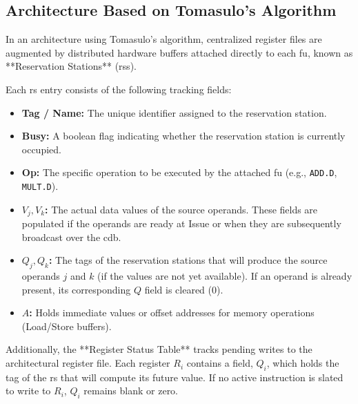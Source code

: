 \subsection{ Architecture Based on Tomasulo's Algorithm}
\label{subsec:tomasulo_fp_arch}

In an architecture using Tomasulo's algorithm, centralized register files are augmented by distributed hardware buffers attached directly to each \gls{fu}, known as **Reservation Stations** (\glspl{rs}). 

Each \gls{rs} entry consists of the following tracking fields:
\begin{itemize}
    \item \textbf{Tag / Name:} The unique identifier assigned to the reservation station.
    \item \textbf{Busy:} A boolean flag indicating whether the reservation station is currently occupied.
    \item \textbf{Op:} The specific operation to be executed by the attached \gls{fu} (e.g., \texttt{ADD.D}, \texttt{MULT.D}).
    \item \textbf{$V_j, V_k$:} The actual data values of the source operands. These fields are populated if the operands are ready at Issue or when they are subsequently broadcast over the \gls{cdb}.
    \item \textbf{$Q_j, Q_k$:} The tags of the reservation stations that will produce the source operands $j$ and $k$ (if the values are not yet available). If an operand is already present, its corresponding $Q$ field is cleared ($0$).
    \item \textbf{$A$:} Holds immediate values or offset addresses for memory operations (Load/Store buffers).
\end{itemize}

Additionally, the **Register Status Table** tracks pending writes to the architectural register file. Each register $R_i$ contains a field, $Q_i$, which holds the tag of the \gls{rs} that will compute its future value. If no active instruction is slated to write to $R_i$, $Q_i$ remains blank or zero.

